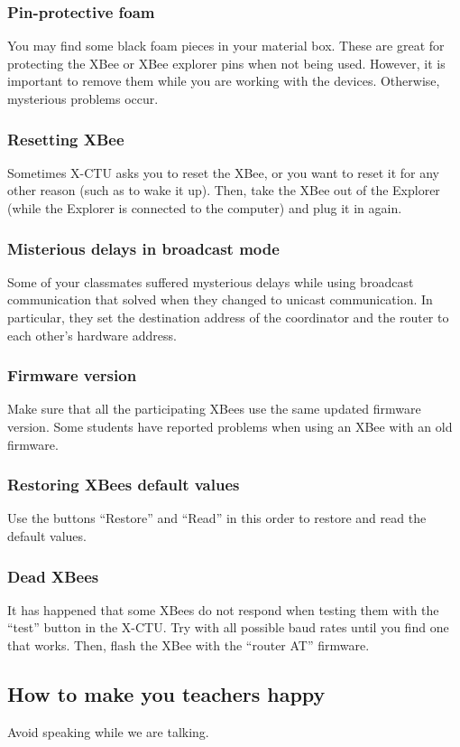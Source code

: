 \subsubsection{Pin-protective foam}
You may find some black foam pieces in your material box.
These are great for protecting the XBee or XBee explorer pins when not being used.
However, it is important to remove them while you are working with the devices.
Otherwise, mysterious problems occur.

\subsubsection{Resetting XBee}
Sometimes X-CTU asks you to reset the XBee, or you want to reset it for any other reason (such as to wake it up).
Then, take the XBee out of the Explorer (while the Explorer is connected to the computer) and plug it in again.

\subsubsection{Misterious delays in broadcast mode}
Some of your classmates suffered mysterious delays while using broadcast communication that solved when they changed to unicast communication.
In particular, they set the destination address of the coordinator and the router to each other's hardware address.

\subsubsection{Firmware version}
Make sure that all the participating XBees use the same updated firmware version.
Some students have reported problems when using an XBee with an old firmware.

\subsubsection{Restoring XBees default values}
Use the buttons ``Restore'' and ``Read'' in this order to restore and read the default values.

\subsubsection{Dead XBees}
It has happened that some XBees do not respond when testing them with the ``test'' button in the X-CTU.
Try with all possible baud rates until you find one that works.
Then, flash the XBee with the ``router AT'' firmware.

\subsection{How to make you teachers happy}

Avoid speaking while we are talking.
